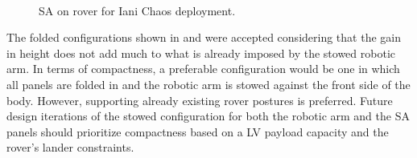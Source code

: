 \begin{figure}[h]
\begin{subfigure}[t]{\subfigureWidth}
		\label{fig:sub:solar-array-on-rover-for-iani-chaos-deployed}
	\end{subfigure}\\[0.8ex]
    \caption[Solar array on rover for Iani Chaos deployment]
            {\ac{SA} on rover for Iani Chaos deployment.}
    \label{fig:solar-array-on-rover-iani-chaos}
\vspace{-2ex}
\end{figure}

\vspace{0.5cm}

The folded configurations shown in  and  were accepted considering that the gain in height does not add much to what is already imposed by the stowed robotic arm. In terms of compactness, a preferable configuration would be one in which all panels are folded in and the robotic arm is stowed against the front side of the body. However, supporting already existing rover postures is preferred. Future design iterations of the stowed configuration for both the robotic arm and the \ac{SA} panels should prioritize compactness based on a \ac{LV} payload capacity and the rover's lander constraints.

\vspace{0.5cm}

